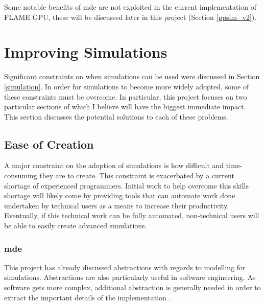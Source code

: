 \documentclass{UoYCSproject}
\begin{document}
Some notable benefits of \gls{mde} are not exploited in the current implementation of \gls{FLAME GPU}, these will be discussed later in this project (Section \ref{ppsim_v2}).

\section{Improving Simulations}
\label{improvements}
Significant constraints on when simulations can be used were discussed in Section \ref{simulation}.
In order for simulations to become more widely adopted, some of these constraints must be overcome. 
In particular, this project focuses on two particular sections of which I believe will have the biggest immediate impact.
This section discusses the potential solutions to each of these problems.

\subsection{Ease of Creation}
\label{ease-of-creation}
A major constraint on the adoption of simulations is how difficult and time-consuming they are to create.
This constraint is exacerbated by a current shortage of experienced programmers.
Initial work to help overcome this skills shortage will likely come by providing tools that can automate work done undertaken by technical users as a means to increase their productivity.
Eventually, if this technical work can be fully automated, non-technical users will be able to easily create advanced simulations.



\subsubsection{\acrlong{mde}}
This project has already discussed abstractions with regards to modelling for simulations.
Abstractions are also particularly useful in software engineering.
As software gets more complex, additional abstraction is generally needed in order to extract the important details of the implementation \cite[p.24]{csapp}.
\end{document}
